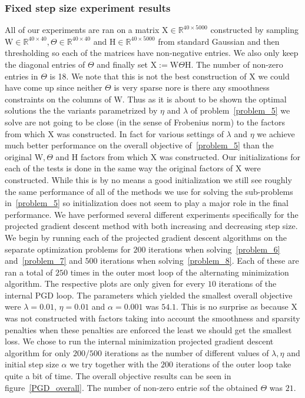 \documentclass{article}
\newcommand{\0}{\mathrm{0}}
\newcommand{\1}{\mathrm{1}}
\renewcommand{\H}{\mathrm{H}}
\newcommand{\W}{\mathrm{W}}
\newcommand{\X}{\mathrm{X}}
\begin{document}
\subsubsection{Fixed step size experiment results}
%
All of our experiments are ran on a matrix $\X \in \mathbb{R}^{40\times 5000}$ constructed by sampling $\W \in \mathbb{R}^{40\times 40}, \Theta \in \mathbb{R}^{40\times 40}$ and $\H \in \mathbb{R}^{40\times 5000}$ from standard Gaussian and then thresholding so each of the matrices have non-negative entries. We also only keep the diagonal entries of $\Theta$ and finally set $\X := \W\Theta\H$. The number of non-zero entries in $\Theta$ is 18. We note that this is not the best construction of $\X$ we could have come up since neither $\Theta$ is very sparse nore is there any smoothness constraints on the columns of $\W$. Thus as it is about to be shown the optimal solutions the the variants parametrized by $\eta$ and $\lambda$ of problem~\ref{problem_5} we solve are not going to be close (in the sense of Frobenius norm) to the factors from which $\X$ was constructed. In fact for various settings of $\lambda$ and $\eta$ we achieve much better performance on the overall objective of~\ref{problem_5} than the original $\W,\Theta$ and $\H$ factors from which $\X$ was constructed. Our initializations for each of the tests is done in the same way the original factors of $\X$ were constructed. While this is by no means a good initialization we still see roughly the same performance of all of the methods we use for solving the sub-problems in~\ref{problem_5} so initialization does not seem to play a major role in the final performance. We have performed several different experiments specifically for the projected gradient descent method with both increasing and decreasing step size. We begin by running each of the projected gradient descent algorithms on the separate optimization problems for $200$ iterations when solving~\ref{problem_6} and~\ref{problem_7} and $500$ iterations when solving~\ref{problem_8}. Each of these are ran a total of $250$ times in the outer most loop of the alternating minimization algorithm. The respective plots are only given for every $10$ iterations of the internal PGD loop. The parameters which yielded the smallest overall objective were $\lambda = 0.01$, $\eta = 0.01$ and $\alpha = 0.001$ was $54.1$. This is no surprise as because $\X$ was not constructed with factors taking into account the smoothness and sparsity penalties when these penalties are enforced the least we should get the smallest loss. We chose to run the internal minimization projected gradient descent algorithm for only $200/500$ iterations as the number of different values of $\lambda,\eta$ and initial step size $\alpha$ we try together with the $200$ iterations of the outer loop take quite a bit of time. The overall objective results can be seen in figure~\ref{PGD_overall}. The number of non-zero entrie sof the obtained $\Theta$ was $21$.
\end{document}
